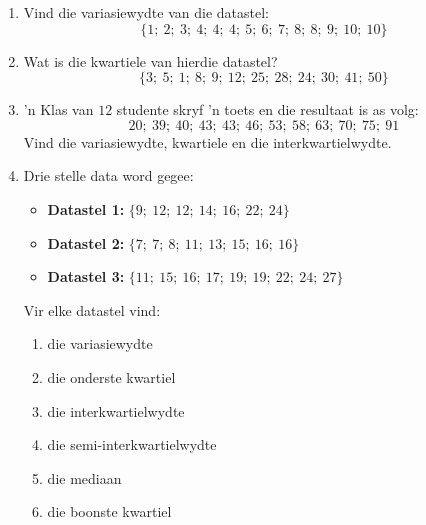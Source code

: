 \begin{exercises}{}{
  \begin{enumerate}[noitemsep, label=\textbf{\arabic*}.]

  \item Vind die variasiewydte van die datastel:
    \begin{equation*}
      \{1;\ 2;\ 3;\ 4;\ 4;\ 4;\ 5;\ 6;\ 7;\ 8;\ 8;\ 9;\ 10;\ 10\}
    \end{equation*}

  \item Wat is die kwartiele van hierdie datastel?
    \begin{equation*}
      \{3;\ 5;\ 1;\ 8;\ 9;\ 12;\ 25;\ 28;\ 24;\ 30;\ 41;\ 50\}
    \end{equation*}

  \item ’n Klas van $12$ studente skryf ’n toets en die resultaat is as volg:
    \begin{equation*}
      20;\ 39;\ 40;\ 43;\ 43;\ 46;\ 53;\ 58;\ 63;\ 70;\ 75;\ 91
    \end{equation*}
    Vind die variasiewydte, kwartiele en die interkwartielwydte.

  \item Drie stelle data word gegee:
    \begin{itemize}  
    \item \textbf{Datastel 1:} $\{9;\ 12;\ 12;\ 14;\ 16;\ 22;\ 24\}$
    \item \textbf{Datastel 2:} $\{7;\ 7;\ 8;\ 11;\ 13;\ 15;\ 16;\ 16\}$
    \item \textbf{Datastel 3:} $\{11;\ 15;\ 16;\ 17;\ 19;\ 19;\ 22;\ 24;\ 27\}$
    \end{itemize}
    Vir elke datastel vind:
    \begin{enumerate}[noitemsep, label=\textbf{(\alph*)} ]
    \item die variasiewydte
    \item die onderste kwartiel
    \item die interkwartielwydte
    \item die semi-interkwartielwydte
    \item die mediaan
    \item die boonste kwartiel
    \end{enumerate}
  \end{enumerate}
}
\end{exercises}

